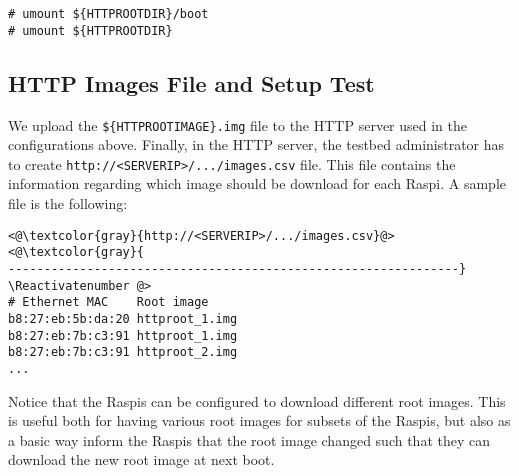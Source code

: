 \begin{lstlisting}[]
# umount ${HTTPROOTDIR}/boot
# umount ${HTTPROOTDIR}
\end{lstlisting}
\FloatBarrier
\vspace{-5mm}




\subsection{HTTP Images File and Setup Test}

We upload the \texttt{\$\{HTTPROOTIMAGE\}.img} file to the \ac{HTTP}
server used in the configurations above. Finally, in the \ac{HTTP} server,
the testbed administrator has to create
\texttt{http://<SERVERIP>/.../images.csv} file. This file contains the
information regarding which image should be download for each \ac{Raspi}. A
sample file is the following:

\Suppressnumber\begin{lstlisting}[]
<@\textcolor{gray}{http://<SERVERIP>/.../images.csv}@>
<@\textcolor{gray}{
---------------------------------------------------------------}
\Reactivatenumber @>
# Ethernet MAC    Root image
b8:27:eb:5b:da:20 httproot_1.img
b8:27:eb:7b:c3:91 httproot_1.img
b8:27:eb:7b:c3:91 httproot_2.img
...
\end{lstlisting}
\FloatBarrier
\vspace{-5mm}

Notice that the \ac{Raspi}s can be configured to download different
root images. This is useful both for having various root images for subsets
of the \ac{Raspi}s, but also as a basic way inform the \ac{Raspi}s that
the root image changed such that they can download the new root image at
next boot.


